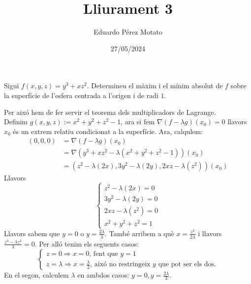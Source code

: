 \documentclass[a4paper, 12pt]{article}
\title{Lliurament 3}
\author{Eduardo Pérez Motato}
\date{27/05/2024}
\begin{document}
    \makeheader

    \setcounter{numex}{56}
    \begin{exercici}
        Sigui $f\left(x,y,z\right) = y^3 + xz^2$. Determineu el màxim i el mínim absolut de $f$
        sobre la superfície de l'esfera centrada a l'origen i de radi $1$.
    \end{exercici}
    \begin{solucio}
        Per aixó hem de fer servir el teorema dels multiplicadors de Lagrange.\\
        Definim $g(x,y,z) := x^2+y^2+z^2-1$, ara si fem $\nabla(f-\lambda g)(x_0) = 0$ llavors $x_0$
        és un extrem relatiu condicionat a la superfície. Ara, calqulem:
        \begin{displaymath}
            \begin{split}
                (0,0,0) &=\nabla(f-\lambda g)(x_0)\\
                  &=\nabla\left(y^3+xz^2 - \lambda(x^2+y^2+z^2-1)\right)(x_0)\\
                  &=\left(z^2 - \lambda(2x), 3y^2 - \lambda(2y), 2xz - \lambda(z^2)\right)(x_0)
            \end{split}
        \end{displaymath}
        Llavors
        \begin{displaymath}
            \begin{cases}
                z^2 - \lambda(2x) = 0\\
                3y^2 - \lambda(2y) = 0\\
                2xz - \lambda(z^2) = 0\\
                x^2+y^2+z^2 = 1
            \end{cases}
        \end{displaymath}
        Llavors sabem que $y = 0$ o $y = \frac{2\lambda}{3}$. També arribem a què $x = \frac{z^2}{2\lambda}$ i 
        llavors $\frac{z^3-\lambda z^2}{\lambda} = 0$. Per alló tenim els seguents casos:
        \begin{displaymath}
            \begin{cases}
                z = 0 \Rightarrow x = 0\text{, fent que } y = 1\\
                z = \lambda \Rightarrow x = \frac{\lambda}{2}\text{, aixó no restringeix }y\text{ que pot ser els dos}.
            \end{cases}
        \end{displaymath}
        En el segon, calculem $\lambda$ en ambdos casos: $y = 0, y = \frac{2\lambda}{3}$.\\

\end{solucio}
\end{document}
